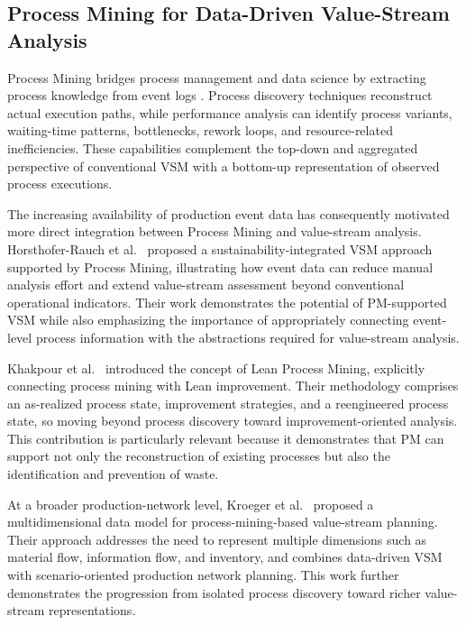 \documentclass[pdflatex,iicol,Numbered,sn-basic]{sn-jnl}
\begin{document}
\subsection{Process Mining for Data-Driven Value-Stream Analysis}

Process Mining bridges process management and data science by extracting
process knowledge from event logs \cite{vanDerAalst2016}. Process discovery
techniques reconstruct actual execution paths, while performance analysis can
identify process variants, waiting-time patterns, bottlenecks, rework loops,
and resource-related inefficiencies. These capabilities complement the
top-down and aggregated perspective of conventional VSM with a bottom-up
representation of observed process executions.

The increasing availability of production event data has consequently motivated
more direct integration between Process Mining and value-stream analysis.
Horsthofer-Rauch et al.~\cite{HorsthoferRauch2024SustainabilityVSM} proposed a
sustainability-integrated VSM approach supported by Process Mining, illustrating
how event data can reduce manual analysis effort and extend value-stream
assessment beyond conventional operational indicators. Their work demonstrates
the potential of PM-supported VSM while also emphasizing the importance of
appropriately connecting event-level process information with the abstractions
required for value-stream analysis.

Khakpour et al.~\cite{Khakpour2025LeanProcessMining} introduced the concept of
Lean Process Mining, explicitly connecting process mining with Lean
improvement. Their methodology comprises an as-realized process state,
improvement strategies, and a reengineered process state, so moving beyond
process discovery toward improvement-oriented analysis. This contribution is
particularly relevant because it demonstrates that PM can support not only the
reconstruction of existing processes but also the identification and prevention
of waste.

At a broader production-network level, Kroeger et al.~\cite{Kroeger2025MultidimensionalPM} proposed a multidimensional data model for
process-mining-based value-stream planning. Their approach addresses the need to
represent multiple dimensions such as material flow, information flow, and
inventory, and combines data-driven VSM with scenario-oriented production
network planning. This work further demonstrates the progression from isolated
process discovery toward richer value-stream representations.
\end{document}
